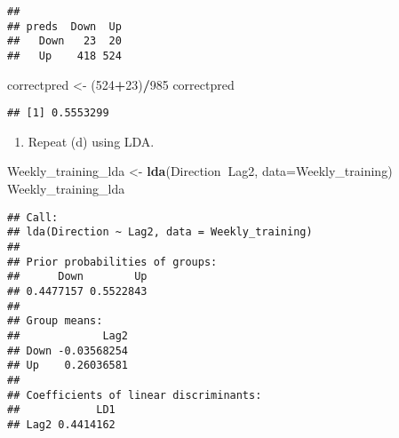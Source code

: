 \documentclass[]{article}
\newenvironment{Shaded}{\begin{snugshade}}{\end{snugshade}}
\newcommand{\KeywordTok}[1]{\textcolor[rgb]{0.13,0.29,0.53}{\textbf{#1}}}
\newcommand{\DataTypeTok}[1]{\textcolor[rgb]{0.13,0.29,0.53}{#1}}
\newcommand{\DecValTok}[1]{\textcolor[rgb]{0.00,0.00,0.81}{#1}}
\newcommand{\FloatTok}[1]{\textcolor[rgb]{0.00,0.00,0.81}{#1}}
\newcommand{\StringTok}[1]{\textcolor[rgb]{0.31,0.60,0.02}{#1}}
\newcommand{\CommentTok}[1]{\textcolor[rgb]{0.56,0.35,0.01}{\textit{#1}}}
\newcommand{\OperatorTok}[1]{\textcolor[rgb]{0.81,0.36,0.00}{\textbf{#1}}}
\newcommand{\NormalTok}[1]{#1}
\providecommand{\tightlist}{%
  \setlength{\itemsep}{0pt}\setlength{\parskip}{0pt}}
\begin{document}
\begin{Shaded}
\end{Shaded}

\begin{verbatim}
##       
## preds  Down  Up
##   Down   23  20
##   Up    418 524
\end{verbatim}

\begin{Shaded}
\begin{Highlighting}[]
\NormalTok{correctpred <-}\StringTok{ }\NormalTok{(}\DecValTok{524}\OperatorTok{+}\DecValTok{23}\NormalTok{)}\OperatorTok{/}\DecValTok{985}
\NormalTok{correctpred}
\end{Highlighting}
\end{Shaded}

\begin{verbatim}
## [1] 0.5553299
\end{verbatim}

\begin{enumerate}
\def\labelenumi{(\alph{enumi})}
\setcounter{enumi}{4}
\tightlist
\item
  Repeat (d) using LDA.
\end{enumerate}

\begin{Shaded}
\begin{Highlighting}[]
\NormalTok{Weekly_training_lda <-}\StringTok{ }\KeywordTok{lda}\NormalTok{(Direction}\OperatorTok{~}\NormalTok{Lag2, }\DataTypeTok{data=}\NormalTok{Weekly_training)}
\NormalTok{Weekly_training_lda}
\end{Highlighting}
\end{Shaded}

\begin{verbatim}
## Call:
## lda(Direction ~ Lag2, data = Weekly_training)
## 
## Prior probabilities of groups:
##      Down        Up 
## 0.4477157 0.5522843 
## 
## Group means:
##             Lag2
## Down -0.03568254
## Up    0.26036581
## 
## Coefficients of linear discriminants:
##            LD1
## Lag2 0.4414162
\end{verbatim}
\end{document}
